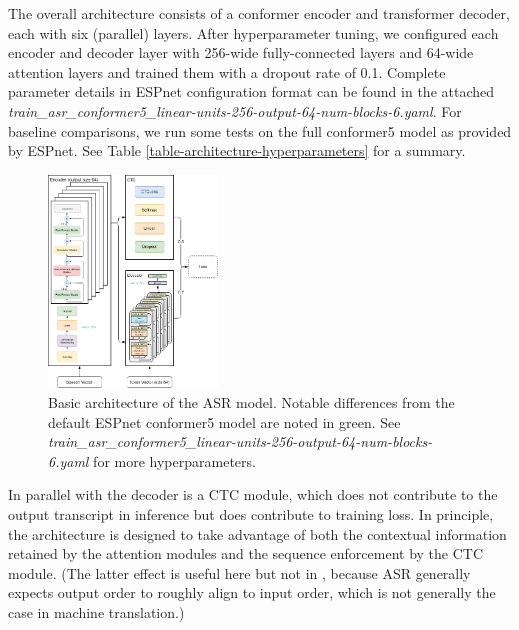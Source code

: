 \documentclass{article}
\begin{document}
  The overall architecture consists of a conformer encoder and transformer decoder, each with six (parallel) layers. After hyperparameter tuning, we configured each encoder and decoder layer with 256-wide fully-connected layers and 64-wide attention layers and trained them with a dropout rate of 0.1. Complete parameter details in ESPnet configuration format can be found in the attached \textit{train\_asr\_conformer5\_linear-units-256-output-64-num-blocks-6.yaml}. For baseline comparisons, we run some tests on the full conformer5 model as provided by ESPnet. See Table \ref{table-architecture-hyperparameters} for a summary.
  \begin{figure}
    \includegraphics[width=0.4\textwidth]{images/architecture}
    \caption{Basic architecture of the ASR model. Notable differences from the default ESPnet conformer5 model are noted in green. See \textit{train\_asr\_conformer5\_linear-units-256-output-64-num-blocks-6.yaml} for more hyperparameters.}
  \end{figure}
  In parallel with the decoder is a CTC module, which does not contribute to the output transcript in inference but does contribute to training loss. In principle, the architecture is designed to take advantage of both the contextual information retained by the attention modules and the sequence enforcement by the CTC module. (The latter effect is useful here but not in \cite{Liu}, because ASR generally expects output order to roughly align to input order, which is not generally the case in machine translation.)
\end{document}
